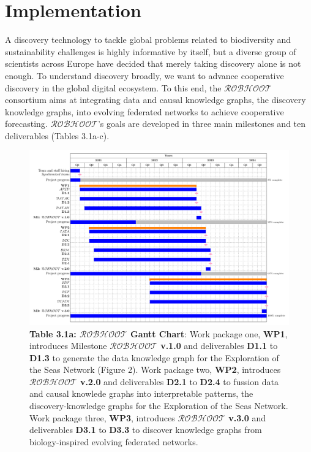 \documentclass[11pt, a4paper]{article} %
\begin{document}
{\section{Implementation}

A discovery technology to tackle global problems related to
biodiversity and sustainability challenges is highly informative by
itself, but a diverse group of scientists across Europe have decided
that merely taking discovery alone is not enough. To understand
discovery broadly, we want to advance cooperative discovery in the
global digital ecosystem. To this end, the $\mathcal{ROBHOOT}$
consortium aims at integrating data and causal knowledge graphs, the
discovery knowledge graphs, into evolving federated networks to
achieve cooperative forecasting. $\mathcal{ROBHOOT}$'s goals are
developed in three main milestones and ten deliverables (Tables
3.1a-c).

\begin{figure}[h!]
   \includegraphics[width=1\textwidth]{Figures/GanttChart.pdf}
   \caption*{{\small {\bf Table 3.1a: $\mathcal{ROBHOOT}$ Gantt
         Chart}: Work package one, {\bf WP1}, introduces Milestone
       {\bf $\mathcal{ROBHOOT}$ v.1.0} and deliverables {\bf D1.1} to
       {\bf D1.3} to generate the data knowledge graph for the
       Exploration of the Seas Network (Figure 2). Work package two,
       {\bf WP2}, introduces {\bf $\mathcal{ROBHOOT}$ v.2.0} and
       deliverables {\bf D2.1} to {\bf D2.4} to fussion data and
       causal knowlede graphs into interpretable patterns, the
       discovery-knowledge graphs for the Exploration of the Seas
       Network. Work package three, {\bf WP3}, introduces {\bf
         $\mathcal{ROBHOOT}$ v.3.0} and deliverables {\bf D3.1} to
       {\bf D3.3} to discover knowledge graphs from biology-inspired
       evolving federated networks.}}
\end{figure}

}
\end{document}
